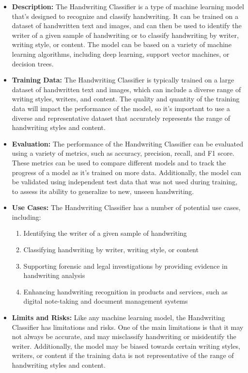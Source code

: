 \begin{itemize}
    \item \textbf{Description:} The Handwriting Classifier is a type of machine learning model that's designed to recognize and classify handwriting. It can be trained on a dataset of handwritten text and images, and can then be used to identify the writer of a given sample of handwriting or to classify handwriting by writer, writing style, or content. The model can be based on a variety of machine learning algorithms, including deep learning, support vector machines, or decision trees.
    \item \textbf{Training Data:} The Handwriting Classifier is typically trained on a large dataset of handwritten text and images, which can include a diverse range of writing styles, writers, and content. The quality and quantity of the training data will impact the performance of the model, so it's important to use a diverse and representative dataset that accurately represents the range of handwriting styles and content.
    \item \textbf{Evaluation:} The performance of the Handwriting Classifier can be evaluated using a variety of metrics, such as accuracy, precision, recall, and F1 score. These metrics can be used to compare different models and to track the progress of a model as it's trained on more data. Additionally, the model can be validated using independent test data that was not used during training, to assess its ability to generalize to new, unseen handwriting.
    \item \textbf{Use Cases:} The Handwriting Classifier has a number of potential use cases, including:
        \begin{enumerate}  
            \item Identifying the writer of a given sample of handwriting
            \item Classifying handwriting by writer, writing style, or content
            \item Supporting forensic and legal investigations by providing evidence in handwriting analysis
            \item Enhancing handwriting recognition in products and services, such as digital note-taking and document management systems
        \end{enumerate}
    \item \textbf{Limits and Risks:} Like any machine learning model, the Handwriting Classifier has limitations and risks. One of the main limitations is that it may not always be accurate, and may misclassify handwriting or misidentify the writer. Additionally, the model may be biased towards certain writing styles, writers, or content if the training data is not representative of the range of handwriting styles and content.

\end{itemize}
